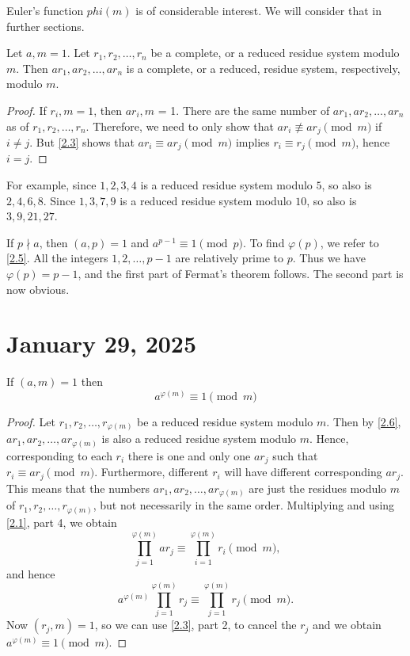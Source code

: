 \documentclass[11pt]{article}
\begin{document}
Euler's function \(phi (m)\) is of considerable interest. We will consider that
in further sections.
\begin{theorem}\label{2.6}
    Let \(a, m = 1\). Let \(r_1, r_2, \ldots, r_n\) be a complete, or a reduced residue system modulo \(m\). Then \(ar_1, ar_2, \ldots, ar_n\) is a complete, or a reduced, residue system, respectively, modulo \(m\).
\end{theorem}
\begin{proof}
    If \(r_i, m = 1\), then \(ar_i, m\) = 1. There are the same number of \(ar_1, ar_2, \ldots, ar_n\) as of \(r_1, r_2, \ldots, r_n\). Therefore, we need to only show that \(ar_i \not \equiv ar_j \pmod{m}\) if \(i \neq j\). But \cref{2.3} shows that \(ar_i \equiv ar_j \pmod{m}\) implies \(r_i \equiv r_j \pmod{m}\), hence \(i = j\).
\end{proof}
\begin{example}
    For example, since \(1, 2, 3, 4\) is a reduced residue system modulo \(5\), so also is \(2, 4, 6, 8\). Since \(1, 3, 7, 9\) is a reduced residue system modulo \(10\), so also is \(3, 9, 21, 27\).
\end{example}

\begin{theorem}\label{2.7}
    If \(p \nmid a\), then \((a, p) = 1\) and \(a^{p-1} \equiv 1 \pmod{p}\). To find \(\varphi(p)\), we refer to \cref{2.5}. All the integers \(1, 2, \ldots, p - 1\) are relatively prime to \(p\). Thus we have \(\varphi(p) = p - 1\), and the first part of Fermat's theorem follows. The second part is now obvious.

\end{theorem}

\section{January 29, 2025}
\begin{theorem}\label{2.8}
    If \((a, m) = 1\) then \[a^{\varphi(m)} \equiv 1\pmod{m}\]
\end{theorem}
\begin{proof}
    Let \(r_1, r_2, \ldots, r_{\varphi(m)}\) be a reduced residue system modulo \(m\). Then by \cref{2.6}, \(ar_1, ar_2, \ldots, ar_{\varphi(m)}\) is also a reduced residue system modulo \(m\). Hence, corresponding to each \(r_i\) there is one and only one \(ar_j\) such that \(r_i \equiv ar_j \pmod{m}\). Furthermore, different \(r_i\) will have different corresponding \(ar_j\). This means that the numbers \(ar_1, ar_2, \ldots, ar_{\varphi(m)}\) are just the residues modulo \(m\) of \(r_1, r_2, \ldots, r_{\varphi(m)}\), but not necessarily in the same order. Multiplying and using \cref{2.1}, part 4, we obtain
    \[
        \prod_{j=1}^{\varphi(m)} ar_j \equiv \prod_{i=1}^{\varphi(m)} r_i \pmod{m},
    \]
    and hence
    \[
        a^{\varphi(m)} \prod_{j=1}^{\varphi(m)} r_j \equiv \prod_{j=1}^{\varphi(m)} r_j \pmod{m}.
    \]
    Now \((r_j, m) = 1\), so we can use \cref{2.3}, part 2, to cancel the \(r_j\)
    and we obtain \(a^{\varphi(m)} \equiv 1 \pmod{m}\).
\end{proof}
\end{document}
